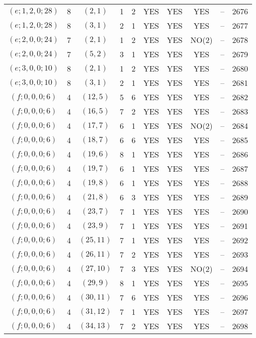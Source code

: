 \begin{longtable}{|c|c|c|c|c|c|c|c|c|c|}
$(e; 1, 2, 0; 28)$ & 8 & $(2, 1)$ & 1 & 2 & YES & YES & YES & -- & 2676\\
$(e; 1, 2, 0; 28)$ & 8 & $(3, 1)$ & 2 & 1 & YES & YES & YES & -- & 2677\\
$(e; 2, 0, 0; 24)$ & 7 & $(2, 1)$ & 1 & 2 & YES & YES & NO(2) & -- & 2678\\
$(e; 2, 0, 0; 24)$ & 7 & $(5, 2)$ & 3 & 1 & YES & YES & YES & -- & 2679\\
$(e; 3, 0, 0; 10)$ & 8 & $(2, 1)$ & 1 & 2 & YES & YES & YES & -- & 2680\\
$(e; 3, 0, 0; 10)$ & 8 & $(3, 1)$ & 2 & 1 & YES & YES & YES & -- & 2681\\
$(f; 0, 0, 0; 6)$ & 4 & $(12, 5)$ & 5 & 6 & YES & YES & YES & -- & 2682\\
$(f; 0, 0, 0; 6)$ & 4 & $(16, 5)$ & 7 & 2 & YES & YES & YES & -- & 2683\\
$(f; 0, 0, 0; 6)$ & 4 & $(17, 7)$ & 6 & 1 & YES & YES & NO(2) & -- & 2684\\
$(f; 0, 0, 0; 6)$ & 4 & $(18, 7)$ & 6 & 6 & YES & YES & YES & -- & 2685\\
$(f; 0, 0, 0; 6)$ & 4 & $(19, 6)$ & 8 & 1 & YES & YES & YES & -- & 2686\\
$(f; 0, 0, 0; 6)$ & 4 & $(19, 7)$ & 6 & 1 & YES & YES & YES & -- & 2687\\
$(f; 0, 0, 0; 6)$ & 4 & $(19, 8)$ & 6 & 1 & YES & YES & YES & -- & 2688\\
$(f; 0, 0, 0; 6)$ & 4 & $(21, 8)$ & 6 & 3 & YES & YES & YES & -- & 2689\\
$(f; 0, 0, 0; 6)$ & 4 & $(23, 7)$ & 7 & 1 & YES & YES & YES & -- & 2690\\
$(f; 0, 0, 0; 6)$ & 4 & $(23, 9)$ & 7 & 1 & YES & YES & YES & -- & 2691\\
$(f; 0, 0, 0; 6)$ & 4 & $(25, 11)$ & 7 & 1 & YES & YES & YES & -- & 2692\\
$(f; 0, 0, 0; 6)$ & 4 & $(26, 11)$ & 7 & 2 & YES & YES & YES & -- & 2693\\
$(f; 0, 0, 0; 6)$ & 4 & $(27, 10)$ & 7 & 3 & YES & YES & NO(2) & -- & 2694\\
$(f; 0, 0, 0; 6)$ & 4 & $(29, 9)$ & 8 & 1 & YES & YES & YES & -- & 2695\\
$(f; 0, 0, 0; 6)$ & 4 & $(30, 11)$ & 7 & 6 & YES & YES & YES & -- & 2696\\
$(f; 0, 0, 0; 6)$ & 4 & $(31, 12)$ & 7 & 1 & YES & YES & YES & -- & 2697\\
$(f; 0, 0, 0; 6)$ & 4 & $(34, 13)$ & 7 & 2 & YES & YES & YES & -- & 2698\\

\end{longtable}
